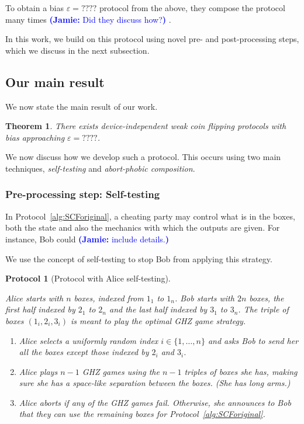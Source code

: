 \documentclass[11pt]{article}
\newtheorem{theorem}{Theorem}
\newtheorem{protocol}{Protocol}
\newcommand{\eps}{\varepsilon}
\newcommand{\Jnote}[1]{\textcolor{blue}{ {\textbf{(Jamie: }#1\textbf{) }}}}
\begin{document}
To obtain a bias $\eps = ????$ protocol from the above, they compose the protocol many times \Jnote{Did they discuss how?}. 

In this work, we build on this protocol using novel pre- and post-processing steps, which we discuss in the next subsection. 


\subsection{Our main result}  

We now state the main result of our work. 

\begin{theorem} 
There exists device-independent weak coin flipping protocols with bias approaching $\eps = ????$. 
\end{theorem} 

We now discuss how we develop such a protocol. 
This occurs using two main techniques, \emph{self-testing} and \emph{abort-phobic composition}. 


\subsubsection{Pre-processing step: Self-testing} 

In Protocol~\ref{alg:SCForiginal}, a cheating party may control what is in the boxes, both the state and also the mechanics with which the outputs are given. 
For instance, Bob could \Jnote{include details.} 

We use the concept of self-testing to stop Bob from applying this strategy. 

\begin{protocol}[Protocol with Alice self-testing] \label{alg:self-test}  

Alice starts with $n$ boxes, indexed from $1_1$ to $1_n$. 
Bob starts with $2n$ boxes, the first half indexed by $2_1$ to $2_n$ and the last half indexed by $3_1$ to $3_n$. 
The triple of boxes $(1_i, 2_i, 3_i)$ is meant to play the optimal GHZ game strategy.   
\begin{enumerate}    
\item Alice selects a uniformly random index $i \in \{ 1, \ldots, n \}$ and asks Bob to send her all the boxes \emph{except} those indexed by $2_i$ and $3_i$. 
\item Alice plays $n-1$ GHZ games using the $n-1$ triples of boxes she has, making sure she has a space-like separation between the boxes. (She has long arms.) 
\item Alice aborts if \emph{any} of the GHZ games fail. 
Otherwise, she announces to Bob that they can use the remaining boxes for Protocol~\ref{alg:SCForiginal}.   
\end{enumerate} 
\end{protocol}  
\end{document}
